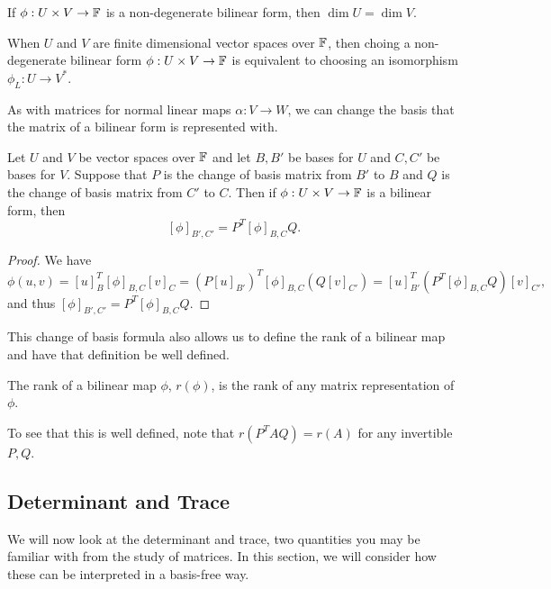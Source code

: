 \documentclass[a4paper]{scrartcl}
\begin{document}
\begin{corollary}
    If $\phi: U \times V \rightarrow \mathbb{F}$ is a non-degenerate bilinear form, then $\dim U = \dim V$.
\end{corollary}

\begin{corollary}
    When $U$ and $V$ are finite dimensional vector spaces over $\mathbb{F}$, then choing a non-degenerate bilinear form $\phi: U \times V \rightarrow \mathbb{F}$ is equivalent to choosing an isomorphism $\phi_L : U \rightarrow V^*$.
\end{corollary}

As with matrices for normal linear maps $\alpha: V \rightarrow W$, we can change the basis that the matrix of a bilinear form is represented with.

\begin{proposition}
    Let $U$ and $V$ be vector spaces over $\mathbb{F}$ and let $B, B'$ be bases for $U$ and $C, C'$ be bases for $V$. Suppose that $P$ is the change of basis matrix from $B'$ to $B$ and $Q$ is the change of basis matrix from $C'$ to $C$. Then if $\phi: U \times V \rightarrow \mathbb{F}$ is a bilinear form, then
    $$
    [\phi]_{B', C'} = P^T [\phi]_{B, C} Q.
    $$
\end{proposition}
\begin{proof}
    We have
    $$
        \phi(u, v) = [u]^T_B [\phi]_{B, C} [v]_C 
            = (P[u]_{B'})^T [\phi]_{B, C} (Q [v]_{C'}) 
                = [u]^T_{B'} (P^T [\phi]_{B, C} Q) [v]_{C'},
    $$
    and thus $[\phi]_{B', C'} = P^T [\phi]_{B, C} Q$.
\end{proof}

This change of basis formula also allows us to define the rank of a bilinear map and have that definition be well defined.

\begin{definition}
    The rank of a bilinear map $\phi$, $r(\phi)$, is the rank of any matrix representation of $\phi$. 
\end{definition}

To see that this is well defined, note that $r(P^T AQ) = r(A)$ for any invertible $P, Q$.

\subsection{Determinant and Trace}

We will now look at the determinant and trace, two quantities you may be familiar with from the study of matrices. In this section, we will consider how these can be interpreted in a basis-free way.
\end{document}
